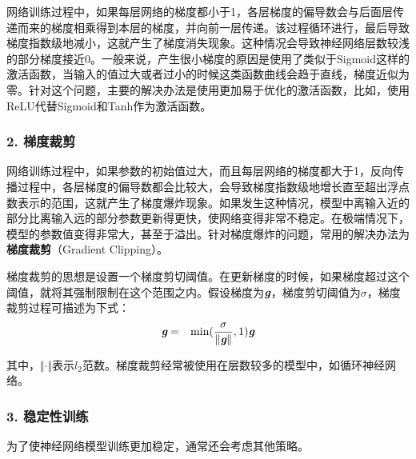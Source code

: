 \parinterval  网络训练过程中，如果每层网络的梯度都小于1，各层梯度的偏导数会与后面层传递而来的梯度相乘得到本层的梯度，并向前一层传递。该过程循环进行，最后导致梯度指数级地减小，这就产生了梯度消失现象。这种情况会导致神经网络层数较浅的部分梯度接近0。一般来说，产生很小梯度的原因是使用了类似于Sigmoid这样的激活函数，当输入的值过大或者过小的时候这类函数曲线会趋于直线，梯度近似为零。针对这个问题，主要的解决办法是使用更加易于优化的激活函数，比如，使用ReLU代替Sigmoid和Tanh作为激活函数。


\subsubsection{2. 梯度裁剪}

\parinterval  网络训练过程中，如果参数的初始值过大，而且每层网络的梯度都大于1，反向传播过程中，各层梯度的偏导数都会比较大，会导致梯度指数级地增长直至超出浮点数表示的范围，这就产生了梯度爆炸现象。如果发生这种情况，模型中离输入近的部分比离输入远的部分参数更新得更快，使网络变得非常不稳定。在极端情况下，模型的参数值变得非常大，甚至于溢出。针对梯度爆炸的问题，常用的解决办法为{\small\sffamily\bfseries{梯度裁剪}}（Gradient Clipping）。

\parinterval    梯度裁剪的思想是设置一个梯度剪切阈值。在更新梯度的时候，如果梯度超过这个阈值，就将其强制限制在这个范围之内。假设梯度为${\textbf{\em g}}$，梯度剪切阈值为$\sigma $，梯度裁剪过程可描述为下式：
\begin{eqnarray}
{\textbf{\em g}}&=&{\textrm{min}}(\frac{\sigma}{\Vert {\textbf{\em g}}\Vert},1){\textbf{\em g}}
\label{eq:9-43}
\end{eqnarray}

\noindent 其中，$ \Vert \cdot \Vert $表示$ l_2 $范数。梯度裁剪经常被使用在层数较多的模型中，如循环神经网络。


\subsubsection{3. 稳定性训练}

\parinterval  为了使神经网络模型训练更加稳定，通常还会考虑其他策略。

